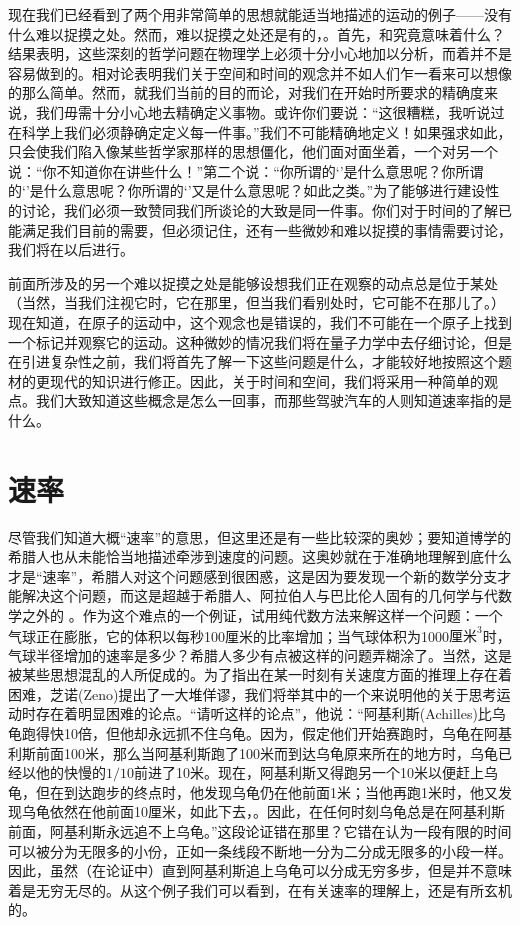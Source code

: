 现在我们已经看到了两个用非常简单的思想就能适当地描述的运动的例子——没有什么难以捉摸之处。然而，难以捉摸之处还是有的，。首先，和究竟意味着什么？结果表明，这些深刻的哲学问题在物理学上必须十分小心地加以分析，而着并不是容易做到的。相对论表明我们关于空间和时间的观念并不如人们乍一看来可以想像的那么简单。然而，就我们当前的目的而论，对我们在开始时所要求的精确度来说，我们毋需十分小心地去精确定义事物。或许你们要说：“这很糟糕，我听说过在科学上我们必须静确定定义每一件事。”我们不可能精确地定义！如果强求如此，只会使我们陷入像某些哲学家那样的思想僵化，他们面对面坐着，一个对另一个说：“你不知道你在讲些什么！”第二个说：“你所谓的‘’是什么意思呢？你所谓的‘’是什么意思呢？你所谓的‘’又是什么意思呢？如此之类。”为了能够进行建设性的讨论，我们必须一致赞同我们所谈论的大致是同一件事。你们对于时间的了解已能满足我们目前的需要，但必须记住，还有一些微妙和难以捉摸的事情需要讨论，我们将在以后进行。

前面所涉及的另一个难以捉摸之处是能够设想我们正在观察的动点总是位于某处（当然，当我们注视它时，它在那里，但当我们看别处时，它可能不在那儿了。）现在知道，在原子的运动中，这个观念也是错误的，我们不可能在一个原子上找到一个标记并观察它的运动。这种微妙的情况我们将在量子力学中去仔细讨论，但是在引进复杂性之前，我们将首先了解一下这些问题是什么，才能较好地按照这个题材的更现代的知识进行修正。因此，关于时间和空间，我们将采用一种简单的观点。我们大致知道这些概念是怎么一回事，而那些驾驶汽车的人则知道速率指的是什么。

\section{速率}

尽管我们知道大概“速率”的意思，但这里还是有一些比较深的奥妙；要知道博学的希腊人也从未能恰当地描述牵涉到速度的问题。这奥妙就在于准确地理解到底什么才是“速率”，希腊人对这个问题感到很困惑，这是因为要发现一个新的数学分支才能解决这个问题，而这是超越于希腊人、阿拉伯人与巴比伦人固有的几何学与代数学之外的 。作为这个难点的一个例证，试用纯代数方法来解这样一个问题：一个气球正在膨胀，它的体积以每秒100厘米的比率增加；当气球体积为1000$\text{厘米}^3$时，气球半径增加的速率是多少？希腊人多少有点被这样的问题弄糊涂了。当然，这是被某些思想混乱的人所促成的。为了指出在某一时刻有关速度方面的推理上存在着困难，芝诺(Zeno)提出了一大堆佯谬，我们将举其中的一个来说明他的关于思考运动时存在着明显困难的论点。“请听这样的论点”，他说：“阿基利斯(Achilles)比乌龟跑得快10倍，但他却永远抓不住乌龟。因为，假定他们开始赛跑时，乌龟在阿基利斯前面100米，那么当阿基利斯跑了100米而到达乌龟原来所在的地方时，乌龟已经以他的快慢的$1/10$前进了10米。现在，阿基利斯又得跑另一个10米以便赶上乌龟，但在到达跑步的终点时，他发现乌龟仍在他前面1米；当他再跑1米时，他又发现乌龟依然在他前面10厘米，如此下去，。因此，在任何时刻乌龟总是在阿基利斯前面，阿基利斯永远追不上乌龟。”这段论证错在那里？它错在认为一段有限的时间可以被分为无限多的小份，正如一条线段不断地一分为二分成无限多的小段一样。因此，虽然（在论证中）直到阿基利斯追上乌龟可以分成无穷多步，但是并不意味着是无穷无尽的。从这个例子我们可以看到，在有关速率的理解上，还是有所玄机的。

